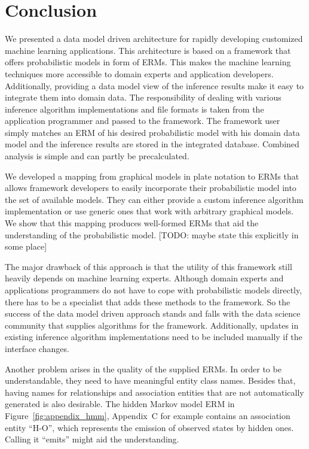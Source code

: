 \section{Conclusion}

We presented a data model driven architecture for rapidly developing customized machine learning applications. This architecture is based on a framework that offers probabilistic models in form of ERMs. This makes the machine learning techniques more accessible to domain experts and application developers. Additionally, providing a data model view of the inference results make it easy to integrate them into domain data. The responsibility of dealing with various inference algorithm implementations and file formats is taken from the application programmer and passed to the framework. The framework user simply matches an ERM of his desired probabilistic model with his domain data model and the inference results are stored in the integrated database. Combined analysis is simple and can partly be precalculated.

We developed a mapping from graphical models in plate notation to ERMs that allows framework developers to easily incorporate their probabilistic model into the set of available models. They can either provide a custom inference algorithm implementation or use generic ones that work with arbitrary graphical models. We show that this mapping produces well-formed ERMs that aid the understanding of the probabilistic model. [TODO: maybe state this explicitly in some place]

The major drawback of this approach is that the utility of this framework still heavily depends on machine learning experts. Although domain experts and applications programmers do not have to cope with probabilistic models directly, there has to be a specialist that adds these methods to the framework. So the success of the data model driven approach stands and falls with the data science community that supplies algorithms for the framework. Additionally, updates in existing inference algorithm implementations need to be included manually if the interface changes.

Another problem arises in the quality of the supplied ERMs. In order to be understandable, they need to have meaningful entity class names. Besides that, having names for relationships and association entities that are not automatically generated is also desirable. The hidden Markov model ERM in Figure~\ref{fig:appendix_hmm}, Appendix~C for example contains an association entity ``H-O'', which represents the emission of observed states by hidden ones. Calling it ``emits'' might aid the understanding.

